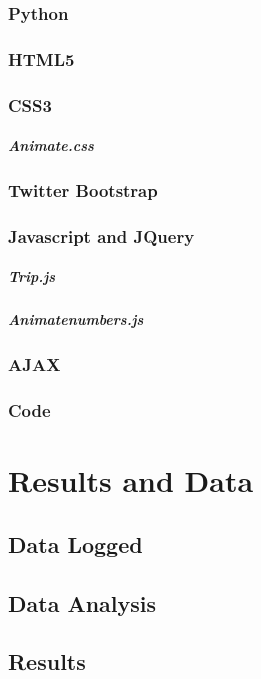 \documentclass{mproj}
\begin{document}
\subsection{Python}
\subsection{HTML5}
\subsection{CSS3}
\paragraph{Animate.css}
\subsection{Twitter Bootstrap}
\label{subsec: boot}
\subsection{Javascript and JQuery}
\paragraph{Trip.js}
\paragraph{Animatenumbers.js}
\subsection{AJAX}
\subsection{Code}
\label{subsec:code}

\chapter{Results and Data}\label{results}
\section{Data Logged}
\section{Data Analysis}
\section{Results}
\end{document}

